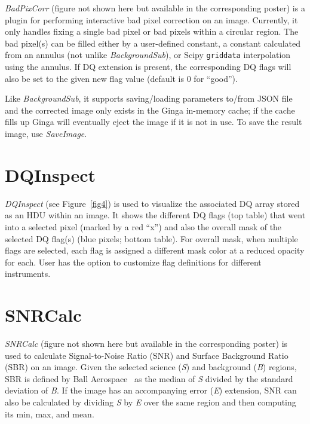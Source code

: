 \documentclass[11pt,twoside]{article}
\begin{document}
{\em BadPixCorr} (figure not shown here but available in the
corresponding poster) is a plugin for performing interactive bad pixel
correction on an image. Currently, it only handles fixing a single bad pixel or
bad pixels within a circular region.
The bad pixel(s) can be filled either by a user-defined constant, a constant
calculated from an annulus (not unlike {\em BackgroundSub}), or Scipy
{\tt griddata} interpolation using the annulus.
If DQ extension is present, the corresponding DQ flags will also be set
to the given new flag value (default is 0 for ``good'').

Like {\em BackgroundSub}, it supports saving/loading parameters to/from
JSON file and the corrected image only exists in the Ginga in-memory cache;
if the cache fills up Ginga will eventually eject the image if it is not
in use.  To save the result image, use {\em SaveImage}.

\section{DQInspect}

{\em DQInspect} (see Figure~\ref{fig4}) is used to visualize the associated DQ
array stored as an HDU within an image.
It shows the different DQ flags (top table) that went into a selected pixel
(marked by a red ``x'')
and also the overall mask of the selected DQ flag(s)
(blue pixels; bottom table).
For overall mask, when multiple flags are selected, each flag is assigned a
different mask color at a reduced opacity for each.
User has the option to customize flag definitions for different instruments.


\section{SNRCalc}

{\em SNRCalc} (figure not shown here but available in the
corresponding poster) is used to calculate Signal-to-Noise Ratio
(SNR) and Surface Background Ratio (SBR) on an image.
Given the selected science ({\em S}) and background ({\em B}) regions,
SBR is defined by Ball Aerospace~\citep{sbr} as the median of {\em S}
divided by the standard deviation of {\em B}.
If the image has an accompanying error ({\em E}) extension, SNR can also
be calculated by dividing {\em S} by {\em E} over the same region and
then computing its min, max, and mean.
\end{document}
